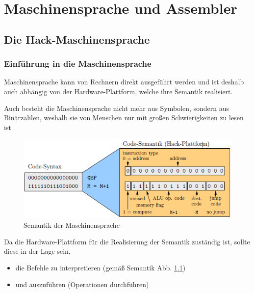 \documentclass[12pt]{report}
\begin{document}
\chapter{Maschinensprache und Assembler}

\section{Die Hack-Maschinensprache}
\subsection{Einführung in die Maschinensprache}
\begin{defbox}[Maschinensprache]
  Maschinensprache kann von Rechnern direkt ausgeführt werden und ist deshalb auch abhängig von der
  Hardware-Plattform, welche ihre Semantik realisiert.
  
  Auch besteht die Maschinensprache nicht mehr aus Symbolen, sondern aus Binärzahlen, weshalb sie von Menschen
  nur mit großen Schwierigkeiten zu lesen ist
\end{defbox}
\begin{figure}[H]
  \caption{Semantik der Maschinensprache}
  \label{fig:semantik_maschinensprache}
  \centering
  \includegraphics{semantik_maschinensprache}
\end{figure}


Da die Hardware-Plattform für die Realisierung der Semantik zuständig ist, sollte diese in der Lage sein,
\begin{itemize}
  \item die Befehle zu interpretieren (gemäß Semantik Abb. \ref{fig:semantik_maschinensprache})
  \item und auszuführen (Operationen durchführen)
\end{itemize}
\end{document}
